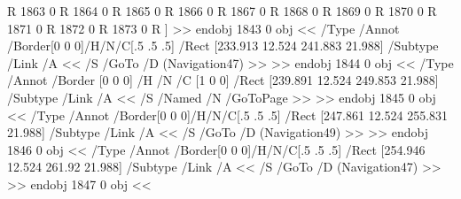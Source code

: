  R 1863 0 R 1864 0 R 1865 0 R 1866 0 R 1867 0 R 1868 0 R 1869 0 R 1870 0 R 1871 0 R 1872 0 R 1873 0 R ]
>> endobj
1843 0 obj <<
/Type /Annot
/Border[0 0 0]/H/N/C[.5 .5 .5]
/Rect [233.913 12.524 241.883 21.988]
/Subtype /Link
/A << /S /GoTo /D (Navigation47) >>
>> endobj
1844 0 obj <<
/Type /Annot
/Border [0 0 0] /H /N /C [1 0 0]
/Rect [239.891 12.524 249.853 21.988]
 /Subtype /Link /A << /S /Named /N /GoToPage >> 
>> endobj
1845 0 obj <<
/Type /Annot
/Border[0 0 0]/H/N/C[.5 .5 .5]
/Rect [247.861 12.524 255.831 21.988]
/Subtype /Link
/A << /S /GoTo /D (Navigation49) >>
>> endobj
1846 0 obj <<
/Type /Annot
/Border[0 0 0]/H/N/C[.5 .5 .5]
/Rect [254.946 12.524 261.92 21.988]
/Subtype /Link
/A << /S /GoTo /D (Navigation47) >>
>> endobj
1847 0 obj <<
